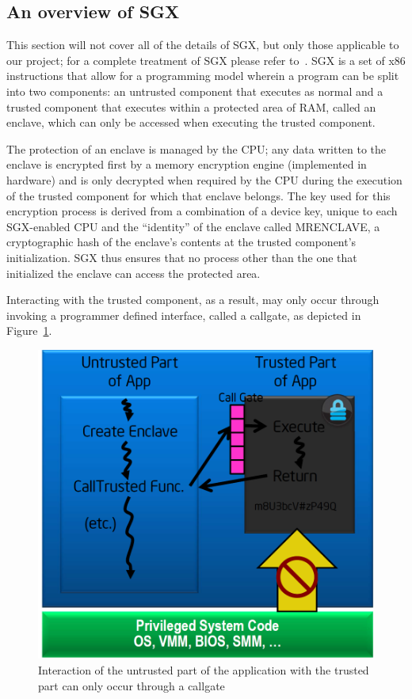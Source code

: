 \documentclass[../main.tex]{subfiles}
\begin{document}
\subsection{An overview of \Intel SGX}

This section will not cover all of the details of SGX, but only those
applicable to our project; for a complete treatment of SGX please
refer to~\cite{IntelCorporation2010}. \Intel SGX is a set of x86
instructions that allow for a programming model wherein a program can
be split into two components: an untrusted component that executes as
normal and a trusted component that executes within a protected area
of RAM, called an enclave, which can only be accessed when executing
the trusted component.

The protection of an enclave is managed by the CPU; any data written
to the enclave is encrypted first by a memory encryption engine
(implemented in hardware) and is only decrypted when required by the
CPU during the execution of the trusted component for which that
enclave belongs. The key used for this encryption process is derived
from a combination of a device key, unique to each SGX-enabled CPU and
the ``identity'' of the enclave called MRENCLAVE, a cryptographic hash
of the enclave's contents at the trusted component's
initialization. SGX thus ensures that no process other than the one
that initialized the enclave can access the protected area.

Interacting with the trusted component, as a result, may only occur
through invoking a programmer defined interface, called a callgate, as
depicted in Figure~\ref{fig:sgxhighlevel}.

\begin{figure}[H]
  \centering
  \includegraphics[scale=0.25]{images/sgxhighlevel.png}
  \caption{Interaction of the untrusted part of the application with
    the trusted part can only occur through a callgate}
  \label{fig:sgxhighlevel}
\end{figure}
\end{document}
